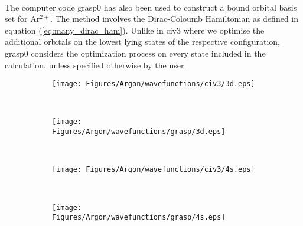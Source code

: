 ~\\
~\\
~\\
~\\
~\\
\\
The computer code {\sc grasp0} has also been used to construct a bound orbital basis set for Ar$^{2+}$. The method involves the Dirac-Coloumb Hamiltonian as defined in equation (\ref{eq:many_dirac_ham}). Unlike in {\sc civ3} where we optimise the additional orbitals on the lowest lying states of the respective configuration, {\sc grasp0} considers the optimization process on every state included in the calculation, unless specified otherwise by the user.


%
\begin{figure}
    \centering
    \begin{subfigure}{0.45\textwidth}
        \texttt{[image: Figures/Argon/wavefunctions/civ3/3d.eps]}
    \end{subfigure}
    ~ %
    \begin{subfigure}{0.45\textwidth}
        \texttt{[image: Figures/Argon/wavefunctions/grasp/3d.eps]}
    \end{subfigure}
    ~ %
    \\
     \begin{subfigure}{0.45\textwidth}
        \texttt{[image: Figures/Argon/wavefunctions/civ3/4s.eps]}
    \end{subfigure}
    ~ %
    \begin{subfigure}{0.45\textwidth}
        \texttt{[image: Figures/Argon/wavefunctions/grasp/4s.eps]}
    \end{subfigure}
    ~ %
    \\
      \begin{subfigure}{0.45\textwidth}

\end{subfigure}
\end{figure}

